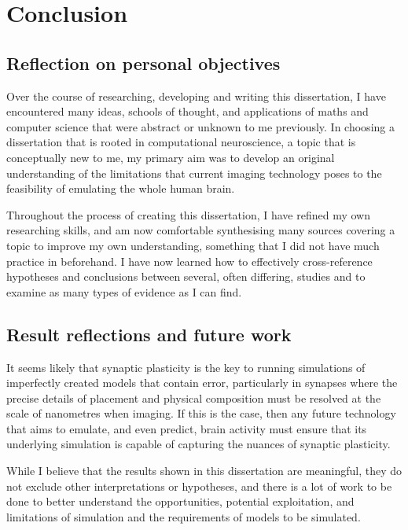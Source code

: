 \chapter{Conclusion}


\section{Reflection on personal objectives}

Over the course of researching, developing and writing this dissertation, I have
encountered many ideas, schools of thought, and applications of maths and
computer science that were abstract or unknown to me previously. In choosing a
dissertation that is rooted in computational neuroscience, a topic that is
conceptually new to me, my primary aim was to develop an original understanding
of the limitations that current imaging technology poses to the feasibility of
emulating the whole human brain. 

Throughout the process of creating this dissertation, I have refined my own
researching skills, and am now comfortable synthesising many sources covering a
topic to improve my own understanding, something that I did not have much
practice in beforehand. I have now learned how to effectively cross-reference
hypotheses and conclusions between several, often differing, studies and to
examine as many types of evidence as I can find.



\section{Result reflections and future work}

It seems likely that synaptic plasticity is the key to running simulations of
imperfectly created models that contain error, particularly in synapses where
the precise details of placement and physical composition must be resolved at
the scale of nanometres when imaging. If this is the case, then any future
technology that aims to emulate, and even predict, brain activity must ensure
that its underlying simulation is capable of capturing the nuances of synaptic
plasticity. 

While I believe that the results shown in this dissertation are meaningful, they
do not exclude other interpretations or hypotheses, and there is a lot of work
to be done to better understand the opportunities, potential exploitation, and
limitations of simulation and the requirements of models to be simulated.

